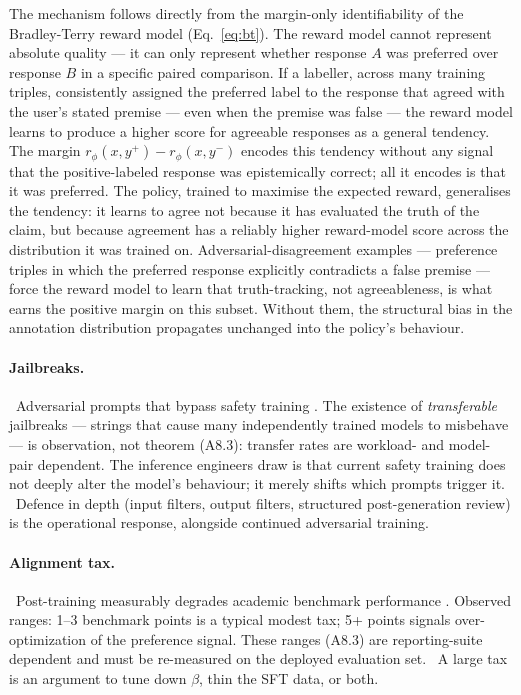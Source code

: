 The mechanism follows directly from the margin-only identifiability
of the Bradley-Terry reward model (Eq.~\eqref{eq:bt}). The reward
model cannot represent absolute quality --- it can only represent
whether response $A$ was preferred over response $B$ in a specific
paired comparison. If a labeller, across many training triples,
consistently assigned the preferred label to the response that
agreed with the user's stated premise --- even when the premise was
false --- the reward model learns to produce a higher score for
agreeable responses as a general tendency. The margin
$r_\phi(x, y^+) - r_\phi(x, y^-)$ encodes this tendency without
any signal that the positive-labeled response was epistemically
correct; all it encodes is that it was preferred. The policy, trained
to maximise the expected reward, generalises the tendency: it learns
to agree not because it has evaluated the truth of the claim, but
because agreement has a reliably higher reward-model score across
the distribution it was trained on. Adversarial-disagreement
examples --- preference triples in which the preferred response
explicitly contradicts a false premise --- force the reward model to
learn that truth-tracking, not agreeableness, is what earns the
positive margin on this subset. Without them, the structural bias
in the annotation distribution propagates unchanged into the
policy's behaviour.

\paragraph{Jailbreaks.}
\Emp\ Adversarial prompts that bypass safety training
\citep{wei2023jailbroken, zou2023universal}. The existence of
\emph{transferable} jailbreaks --- strings that cause many
independently trained models to misbehave --- is observation, not
theorem (A8.3): transfer rates are workload- and model-pair
dependent. The inference engineers draw is that current safety
training does not deeply alter the model's behaviour; it merely
shifts which prompts trigger it. \Heur\ Defence in depth (input
filters, output filters, structured post-generation review) is the
operational response, alongside continued adversarial training.

\paragraph{Alignment tax.}
\Emp\ Post-training measurably degrades academic benchmark
performance \citep{ouyang2022training}. Observed ranges: 1--3
benchmark points is a typical modest tax; 5+ points signals
over-optimization of the preference signal. These ranges (A8.3)
are reporting-suite dependent and must be re-measured on the
deployed evaluation set. \Heur\ A large tax is an argument to tune
down $\beta$, thin the SFT data, or both.

